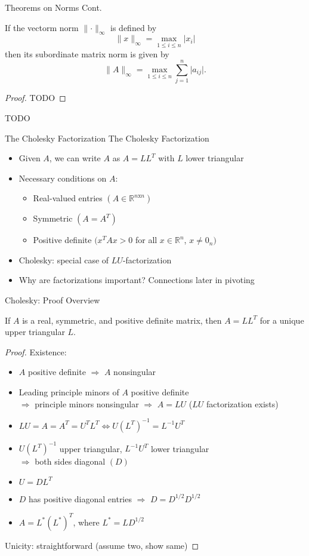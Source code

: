 \documentclass[9pt, serif]{beamer}
\newlength{\wideitemsep}
\let\olditem\item
\renewcommand{\item}{\setlength{\itemsep}{\wideitemsep}\olditem}
\newcommand{\bi}{\begin{itemize}}
\newcommand{\ei}{\end{itemize}}
\newcommand{\abs}[1]{\lvert#1\rvert}
\newcommand{\norm}[1]{\lVert#1\rVert}
\begin{document}
\begin{frame}{Theorems on Norms Cont.}
    \begin{theorem}
        If the vectorm norm $\norm{\cdot}_\infty$ is defined by $$\norm{x}_\infty = \max_{1\le i\le n} \abs{x_i}$$ then its subordinate matrix
        norm is given by $$\norm{A}_\infty = \max_{1\le i \le n} \sum_{j=1}^n \abs{a_{ij}}.$$
    \end{theorem} \pause
    \begin{proof}
        TODO
    \end{proof}
\end{frame}


\begin{frame}
    TODO
\end{frame}


\begin{frame}{The Cholesky Factorization}
The Cholesky Factorization \pause
\bi
\item Given $A$, we can write $A$ as  $A=LL^T$ with $L$ lower triangular\pause
\item Necessary conditions on $A$:\pause
	\bi \item Real-valued entries $(A \in \mathbb{R}^{n\text{x}n})$
	\item Symmetric $(A = A^T)$
	\item Positive definite $(x^TAx > 0$ for all $x \in \mathbb{R}^n$, $x \ne 0_n)$ \pause
	\ei
\item Cholesky: special case of $LU$-factorization\pause
\item Why are factorizations important?  Connections later in pivoting \pause
\ei
\end{frame}


\begin{frame}{Cholesky: Proof Overview}
\begin{theorem}
	If $A$ is a real, symmetric, and positive definite matrix, then $A=LL^T$ for a unique upper triangular $L$. \pause
\end{theorem}
\begin{proof}
    Existence: \pause
    \bi 
    	\item $A$ positive definite $\Rightarrow$ $A$ nonsingular \pause 
		\item Leading principle minors of $A$ positive definite \\$\Rightarrow$ principle minors nonsingular $\Rightarrow$ $A=LU$ ($LU$ factorization exists) \pause
		\item $LU = A = A^T = U^TL^T \Leftrightarrow U(L^T)^{-1} = L^{-1}U^T$ \pause
		\item $U(L^T)^{-1}$ upper triangular, $L^{-1}U^T$ lower triangular \\$\Rightarrow$ both sides diagonal $(D)$ \pause
        \item $U=DL^T$ \pause
	    \item $D$ has positive diagonal entries $\Rightarrow$ $D = D^{1/2}D^{1/2}$ \pause
		\item $A = L^*(L^*)^T$, where $L^* = LD^{1/2}$
    \ei \pause
    Unicity: straightforward (assume two, show same)
\end{proof}
\end{frame}
\end{document}
